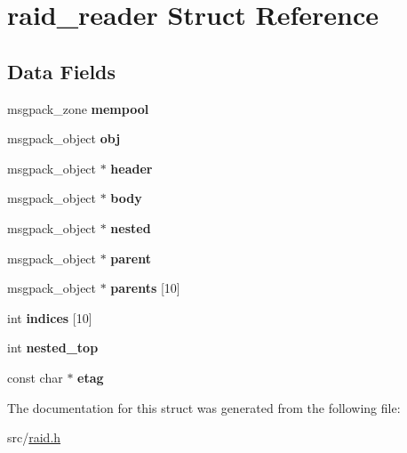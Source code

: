 \hypertarget{structraid__reader}{}\section{raid\+\_\+reader Struct Reference}
\label{structraid__reader}
\subsection*{Data Fields}
\begin{DoxyCompactItemize}
\item 
msgpack\+\_\+zone {\bfseries mempool}\hypertarget{structraid__reader_a749ced514119acc3cc28e0a19b0e98cd}{}\label{structraid__reader_a749ced514119acc3cc28e0a19b0e98cd}

\item 
msgpack\+\_\+object {\bfseries obj}\hypertarget{structraid__reader_a04f51b80017ae6b31377971cd89dd954}{}\label{structraid__reader_a04f51b80017ae6b31377971cd89dd954}

\item 
msgpack\+\_\+object $\ast$ {\bfseries header}\hypertarget{structraid__reader_ab673bf515e84933651b14c3557c13ba8}{}\label{structraid__reader_ab673bf515e84933651b14c3557c13ba8}

\item 
msgpack\+\_\+object $\ast$ {\bfseries body}\hypertarget{structraid__reader_abf8ec44b1583da28d6b77d16c322f999}{}\label{structraid__reader_abf8ec44b1583da28d6b77d16c322f999}

\item 
msgpack\+\_\+object $\ast$ {\bfseries nested}\hypertarget{structraid__reader_acf056e49abf0bc4cf3f26f225519a016}{}\label{structraid__reader_acf056e49abf0bc4cf3f26f225519a016}

\item 
msgpack\+\_\+object $\ast$ {\bfseries parent}\hypertarget{structraid__reader_a2a35c5b9a918fb1a649fc92b8e2eaecd}{}\label{structraid__reader_a2a35c5b9a918fb1a649fc92b8e2eaecd}

\item 
msgpack\+\_\+object $\ast$ {\bfseries parents} \mbox{[}10\mbox{]}\hypertarget{structraid__reader_a0093c7e1f558fe868401cf52fccb1b04}{}\label{structraid__reader_a0093c7e1f558fe868401cf52fccb1b04}

\item 
int {\bfseries indices} \mbox{[}10\mbox{]}\hypertarget{structraid__reader_a14fe565eb7e4102a385d2aee094a090a}{}\label{structraid__reader_a14fe565eb7e4102a385d2aee094a090a}

\item 
int {\bfseries nested\+\_\+top}\hypertarget{structraid__reader_a8e75778d56ed5dbeb3d5d349bea1ee4e}{}\label{structraid__reader_a8e75778d56ed5dbeb3d5d349bea1ee4e}

\item 
const char $\ast$ {\bfseries etag}\hypertarget{structraid__reader_a5f8e67ab469e7a08171d371e6b84b70b}{}\label{structraid__reader_a5f8e67ab469e7a08171d371e6b84b70b}

\end{DoxyCompactItemize}


The documentation for this struct was generated from the following file\+:\begin{DoxyCompactItemize}
\item 
src/\hyperlink{raid_8h}{raid.\+h}\end{DoxyCompactItemize}
